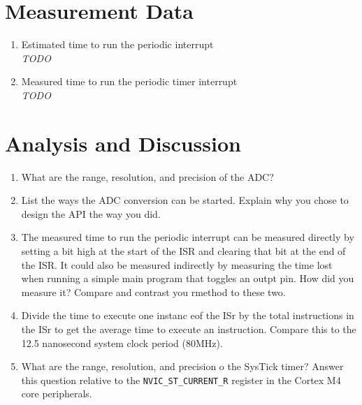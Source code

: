 \documentclass[12pt]{article}
\newcommand{\todo}{{\LARGE \emph{\color{red}TODO}}}
\begin{document}
\section{Measurement Data}
\begin{enumerate}[1)]
  \item Estimated time to run the periodic interrupt \\ \todo
  \item Measured time to run the periodic timer interrupt \\ \todo
  \end{enumerate}
\section{Analysis and Discussion}
\begin{enumerate}[1)]
  \item What are the range, resolution, and precision of the ADC?
  \item List the ways the ADC conversion can be started. Explain why
    you chose to design the API the way you did.
  \item The measured time to run the periodic interrupt can be
    measured directly by setting a bit high at the start of the ISR
    and clearing that bit at the end of the ISR. It could also be
    measured indirectly by measuring the time lost when running a
    simple main program that toggles an outpt pin. How did you measure
    it? Compare and contrast you rmethod to these two.
  \item Divide the time to execute one instanc eof the ISr by the
    total instructions in the ISr to get the average time to execute
    an instruction. Compare this to the 12.5 nanosecond system clock
    period (80MHz).
  \item What are the range, resolution, and precision o the SysTick
    timer? Answer this question relative to the
    \verb|NVIC_ST_CURRENT_R| register in the Cortex M4 core peripherals.
\end{enumerate}
\end{document}
